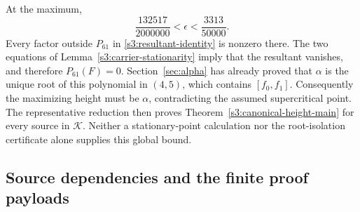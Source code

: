 \documentclass[11pt,reqno]{amsart}
\theoremstyle{definition}
\theoremstyle{remark}
\begin{document}
At the maximum,
\[
 \frac{132517}{2000000}<\epsilon<\frac{3313}{50000}.
\]
Every factor outside \(P_{61}\) in
\eqref{s3:resultant-identity} is nonzero there. The two equations
of Lemma~\ref{s3:carrier-stationarity} imply that the resultant
vanishes, and therefore \(P_{61}(F)=0\).
Section~\ref{sec:alpha} has already proved that \(\alpha\) is
the unique root of this polynomial in \((4,5)\), which contains
\([f_0,f_1]\). Consequently the maximizing height must be
\(\alpha\), contradicting the assumed supercritical point.
The representative reduction then proves
Theorem~\ref{s3:canonical-height-main} for every source in
\(\mathcal K\). Neither a stationary-point calculation nor the
root-isolation certificate alone supplies this global bound.

\clearpage
\subsection{Source dependencies and the finite proof payloads}
\label{s3:provenance}
\end{document}
